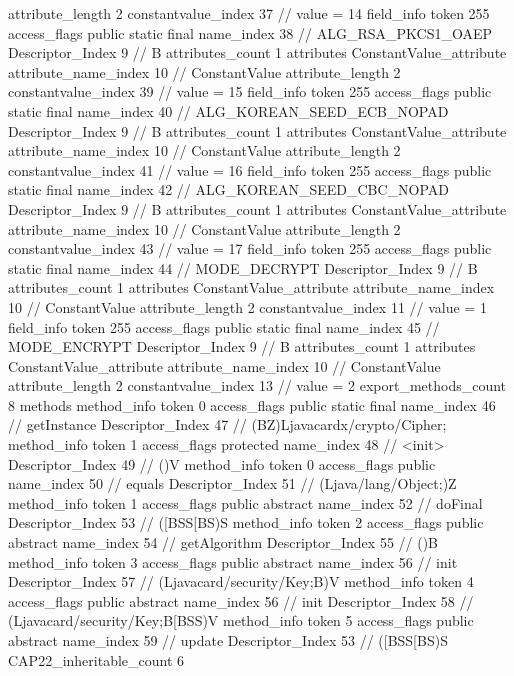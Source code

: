 {{{{{{{					attribute_length	2
					constantvalue_index	37		// value = 14
				}
				}
			}
			field_info {
				token	255
				access_flags	public static final
				name_index	38		// ALG_RSA_PKCS1_OAEP
				Descriptor_Index	9		// B
				attributes_count	1
				attributes {
				ConstantValue_attribute {
					attribute_name_index	10		// ConstantValue
					attribute_length	2
					constantvalue_index	39		// value = 15
				}
				}
			}
			field_info {
				token	255
				access_flags	public static final
				name_index	40		// ALG_KOREAN_SEED_ECB_NOPAD
				Descriptor_Index	9		// B
				attributes_count	1
				attributes {
				ConstantValue_attribute {
					attribute_name_index	10		// ConstantValue
					attribute_length	2
					constantvalue_index	41		// value = 16
				}
				}
			}
			field_info {
				token	255
				access_flags	public static final
				name_index	42		// ALG_KOREAN_SEED_CBC_NOPAD
				Descriptor_Index	9		// B
				attributes_count	1
				attributes {
				ConstantValue_attribute {
					attribute_name_index	10		// ConstantValue
					attribute_length	2
					constantvalue_index	43		// value = 17
				}
				}
			}
			field_info {
				token	255
				access_flags	public static final
				name_index	44		// MODE_DECRYPT
				Descriptor_Index	9		// B
				attributes_count	1
				attributes {
				ConstantValue_attribute {
					attribute_name_index	10		// ConstantValue
					attribute_length	2
					constantvalue_index	11		// value = 1
				}
				}
			}
			field_info {
				token	255
				access_flags	public static final
				name_index	45		// MODE_ENCRYPT
				Descriptor_Index	9		// B
				attributes_count	1
				attributes {
				ConstantValue_attribute {
					attribute_name_index	10		// ConstantValue
					attribute_length	2
					constantvalue_index	13		// value = 2
				}
				}
			}
			}
			export_methods_count	8
			methods {
				method_info {
					token	0
					access_flags	public static final
					name_index	46		// getInstance
					Descriptor_Index	47		// (BZ)Ljavacardx/crypto/Cipher;
				}
				method_info {
					token	1
					access_flags	protected
					name_index	48		// <init>
					Descriptor_Index	49		// ()V
				}
				method_info {
					token	0
					access_flags	public
					name_index	50		// equals
					Descriptor_Index	51		// (Ljava/lang/Object;)Z
				}
				method_info {
					token	1
					access_flags	public abstract
					name_index	52		// doFinal
					Descriptor_Index	53		// ([BSS[BS)S
				}
				method_info {
					token	2
					access_flags	public abstract
					name_index	54		// getAlgorithm
					Descriptor_Index	55		// ()B
				}
				method_info {
					token	3
					access_flags	public abstract
					name_index	56		// init
					Descriptor_Index	57		// (Ljavacard/security/Key;B)V
				}
				method_info {
					token	4
					access_flags	public abstract
					name_index	56		// init
					Descriptor_Index	58		// (Ljavacard/security/Key;B[BSS)V
				}
				method_info {
					token	5
					access_flags	public abstract
					name_index	59		// update
					Descriptor_Index	53		// ([BSS[BS)S
				}
			}
			CAP22_inheritable_count	6
		}
	}
}
